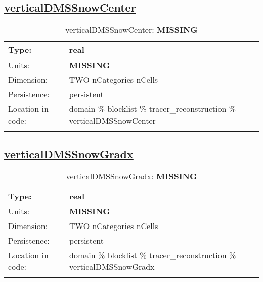 \subsection[verticalDMSSnowCenter]{\hyperref[sec:var_tab_tracer_reconstruction]{verticalDMSSnowCenter}}
\label{subsec:var_sec_tracer_reconstruction_verticalDMSSnowCenter}
\begin{center}
\begin{longtable}{| p{2.0in} | p{4.0in} |}
        \hline 
        Type: & real \\
        \hline 
        Units: & {\bf \color{red} MISSING} \\
        \hline 
        Dimension: & TWO nCategories nCells \\
        \hline 
        Persistence: & persistent \\
        \hline 
         Location in code: & domain \% blocklist \% tracer\_reconstruction \% verticalDMSSnowCenter \\
         \hline 
    \caption{verticalDMSSnowCenter: {\bf \color{red} MISSING}}
\end{longtable}
\end{center}
\subsection[verticalDMSSnowGradx]{\hyperref[sec:var_tab_tracer_reconstruction]{verticalDMSSnowGradx}}
\label{subsec:var_sec_tracer_reconstruction_verticalDMSSnowGradx}
\begin{center}
\begin{longtable}{| p{2.0in} | p{4.0in} |}
        \hline 
        Type: & real \\
        \hline 
        Units: & {\bf \color{red} MISSING} \\
        \hline 
        Dimension: & TWO nCategories nCells \\
        \hline 
        Persistence: & persistent \\
        \hline 
         Location in code: & domain \% blocklist \% tracer\_reconstruction \% verticalDMSSnowGradx \\
         \hline 
    \caption{verticalDMSSnowGradx: {\bf \color{red} MISSING}}
\end{longtable}
\end{center}
